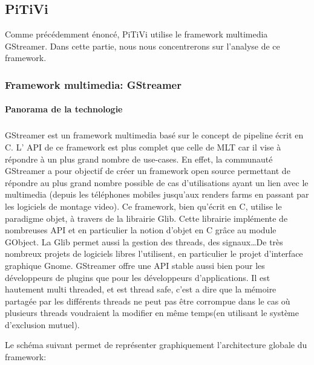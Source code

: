 \subsection {PiTiVi}

Comme précédemment énoncé, PiTiVi utilise le framework multimedia
GStreamer. Dans cette partie, nous nous concentrerons sur l'analyse de
ce framework.

\subsubsection {Framework multimedia: GStreamer}

\paragraph {Panorama de la technologie}

\subparagraph{}

GStreamer est un framework multimedia basé sur le concept de pipeline
écrit en C. L' API de ce framework est plus complet que celle de
MLT car il vise à répondre à un plus grand nombre
de use-cases.  En effet, la communauté GStreamer a pour objectif de
créer un framework open source permettant de répondre au plus grand
nombre possible de cas d'utilisations ayant un lien avec le multimedia
(depuis les téléphones mobiles jusqu'aux renders farms en passant
par les logiciels de montage video). Ce framework, bien qu'écrit en
C, utilise le paradigme objet, à travers de la librairie Glib. Cette
librairie implémente de nombreuses API et en particulier la notion
d'objet en C grâce au module GObject. La Glib permet aussi la gestion
des threads, des signaux\ldots De très nombreux projets de logiciels
libres l'utilisent, en particulier le projet d'interface graphique
Gnome. GStreamer offre une API stable aussi bien pour les développeurs
de plugins que pour les développeurs d'applications. Il est hautement
multi threaded, et est thread safe,
c'est a dire que la mémoire partagée par les différents threads ne
peut pas être corrompue dans le cas où plusieurs threads voudraient
la modifier en même temps(en utilisant le système d'exclusion mutuel).

Le schéma suivant permet de représenter graphiquement l'architecture
globale du framework:

